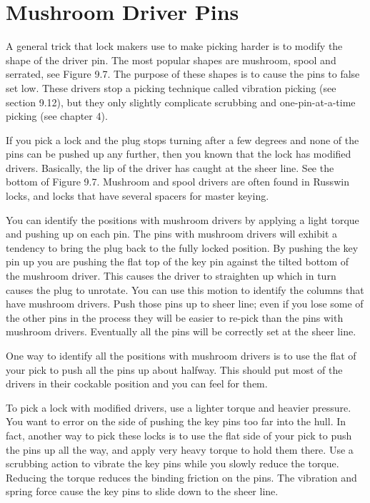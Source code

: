 \section{Mushroom Driver Pins}
A general trick that lock makers use to make picking harder is to modify the shape of 
the driver pin. The most popular shapes are mushroom, spool and serrated, see Figure 
9.7. The purpose of these shapes is to cause the pins to false set low. These drivers stop a 
picking technique called vibration picking (see section 9.12), but they only slightly complicate 
scrubbing and one-pin-at-a-time picking (see chapter 4). 

If you pick a lock and the plug stops turning after a few degrees and none of the pins
can be pushed up any further, then you known that the lock has modified drivers. Basically, 
the lip of the driver has caught at the sheer line. See the bottom of Figure 9.7. Mushroom 
and spool drivers are often found in Russwin locks, and locks that have several spacers for 
master keying. 

You can identify the positions with mushroom drivers by applying a light torque and 
pushing up on each pin. The pins with mushroom drivers will exhibit a tendency to bring 
the plug back to the fully locked position. By pushing the key pin up you are pushing the 
flat top of the key pin against the tilted bottom of the mushroom driver. This causes the 
driver to straighten up which in turn causes the plug to unrotate. You can use this motion 
to identify the columns that have mushroom drivers. Push those pins up to sheer line; even 
if you lose some of the other pins in the process they will be easier to re-pick than the pins 
with mushroom drivers. Eventually all the pins will be correctly set at the sheer line. 

One way to identify all the positions with mushroom drivers is to use the flat of your pick 
to push all the pins up about halfway. This should put most of the drivers in their cockable 
position and you can feel for them. 

To pick a lock with modified drivers, use a lighter torque and heavier pressure. You want 
to error on the side of pushing the key pins too far into the hull. In fact, another way to 
pick these locks is to use the flat side of your pick to push the pins up all the way, and apply 
very heavy torque to hold them there. Use a scrubbing action to vibrate the key pins while 
you slowly reduce the torque. Reducing the torque reduces the binding friction on the pins. 
The vibration and spring force cause the key pins to slide down to the sheer line. 

